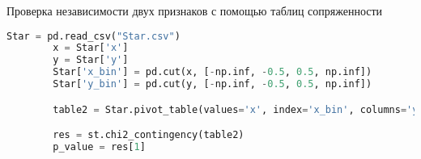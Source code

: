 \begin{problem}
	 Проверка независимости двух признаков с помощью таблиц сопряженности
\end{problem}
\begin{solution}
	\begin{lstlisting}[language=Python]
		Star = pd.read_csv("Star.csv")
		x = Star['x']
		y = Star['y']
		Star['x_bin'] = pd.cut(x, [-np.inf, -0.5, 0.5, np.inf])
		Star['y_bin'] = pd.cut(y, [-np.inf, -0.5, 0.5, np.inf])

		table2 = Star.pivot_table(values='x', index='x_bin', columns='y_bin', aggfunc='count', fill_value=0)

		res = st.chi2_contingency(table2)
		p_value = res[1]
	\end{lstlisting}
\end{solution}



















